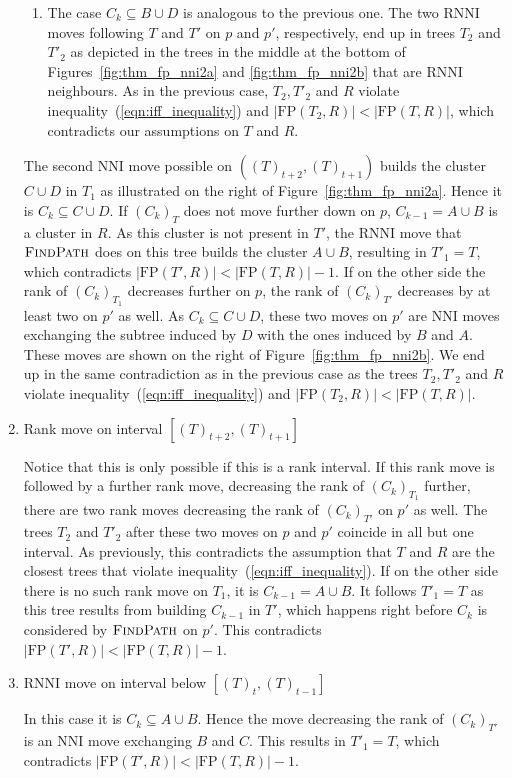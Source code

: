 \documentclass{amsart}
\newcommand{\rnni}{\mathrm{RNNI}}
\newcommand{\findpath}{\textsc{FindPath}}
\newcommand{\nni}{\mathrm{NNI}}
\newcommand{\fp}{\mathrm{FP}}
\begin{document}
\begin{enumerate}[{Case} (1).]
\begin{enumerate}
	\item
	The case $C_k \subseteq B \cup D$ is analogous to the previous one.
    The two $\rnni$ moves following $T$ and $T'$ on $p$ and $p'$, respectively, end up in trees $T_2$ and $T'_2$ as depicted in the trees in the middle at the bottom of Figures~\ref{fig:thm_fp_nni2a} and \ref{fig:thm_fp_nni2b} that are $\rnni$ neighbours.
    As in the previous case, $T_2, T'_2$ and $R$ violate inequality~(\ref{eqn:iff_inequality}) and $|\fp(T_2,R)| < |\fp(T,R)|$, which contradicts our assumptions on $T$ and $R$.
\end{enumerate}

The second $\nni$ move possible on $((T)_{t+2},(T)_{t+1})$ builds the cluster $C \cup D$ in $T_1$ as illustrated on the right of Figure~\ref{fig:thm_fp_nni2a}.
Hence it is $C_k \subseteq C \cup D$.
If $(C_k)_T$ does not move further down on $p$, $C_{k-1} = A \cup B$ is a cluster in $R$.
As this cluster is not present in $T'$, the $\rnni$ move that $\findpath$ does on this tree builds the cluster $A \cup B$, resulting in $T'_1 = T$, which contradicts $|\fp(T',R)| < |\fp(T,R)| - 1$.
If on the other side the rank of $(C_k)_{T_1}$ decreases further on $p$, the rank of $(C_k)_{T'}$ decreases by at least two on $p'$ as well.
As $C_k \subseteq C \cup D$, these two moves on $p'$ are $\nni$ moves exchanging the subtree induced by $D$ with the ones induced by $B$ and $A$.
These moves are shown on the right of Figure~\ref{fig:thm_fp_nni2b}.
We end up in the same contradiction as in the previous case as the trees $T_2, T'_2$ and $R$ violate inequality~(\ref{eqn:iff_inequality}) and $|\fp(T_2,R)| < |\fp(T,R)|$.

\item Rank move on interval $[(T)_{t+2},(T)_{t+1}]$

Notice that this is only possible if this is a rank interval.
If this rank move is followed by a further rank move, decreasing the rank of $(C_k)_{T_1}$ further, there are two rank moves decreasing the rank of $(C_k)_{T'}$ on $p'$ as well.
The trees $T_2$ and $T'_2$ after these two moves on $p$ and $p'$ coincide in all but one interval.
As previously, this contradicts the assumption that $T$ and $R$ are the closest trees that violate inequality~(\ref{eqn:iff_inequality}).
If on the other side there is no such rank move on $T_1$, it is $C_{k-1} = A \cup B$.
It follows $T'_1 = T$ as this tree results from building $C_{k-1}$ in $T'$, which happens right before $C_k$ is considered by $\findpath$ on $p'$.
This contradicts $|\fp(T',R)| < |\fp(T,R)| - 1$.

\item $\rnni$ move on interval below $[(T)_{t},(T)_{t-1}]$

In this case it is $C_k \subseteq A \cup B$.
Hence the move decreasing the rank of $(C_k)_{T'}$ is an $\nni$ move exchanging $B$ and $C$.
This results in $T'_1 = T$, which contradicts $|\fp(T',R)| < |\fp(T,R)| - 1$.
\end{enumerate}
\end{document}
